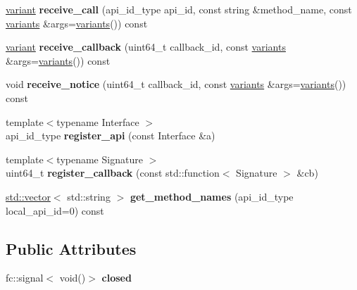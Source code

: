 \begin{DoxyCompactItemize}
\mbox{\hyperlink{classfc_1_1variant}{variant}} {\bfseries receive\+\_\+call} (api\+\_\+id\+\_\+type api\+\_\+id, const string \&method\+\_\+name, const \mbox{\hyperlink{classstd_1_1vector}{variants}} \&args=\mbox{\hyperlink{classstd_1_1vector}{variants}}()) const
\item 
\mbox{\label{classfc_1_1api__connection_a16bc734461e2954bf42d2f97be137eb8}} 
\mbox{\hyperlink{classfc_1_1variant}{variant}} {\bfseries receive\+\_\+callback} (uint64\+\_\+t callback\+\_\+id, const \mbox{\hyperlink{classstd_1_1vector}{variants}} \&args=\mbox{\hyperlink{classstd_1_1vector}{variants}}()) const
\item 
\mbox{\label{classfc_1_1api__connection_ad5bd634f7e967ca90ccc8fd4c3e9fac8}} 
void {\bfseries receive\+\_\+notice} (uint64\+\_\+t callback\+\_\+id, const \mbox{\hyperlink{classstd_1_1vector}{variants}} \&args=\mbox{\hyperlink{classstd_1_1vector}{variants}}()) const
\item 
\mbox{\label{classfc_1_1api__connection_aede0d0e920a2018f3f74841a3c98a270}} 
{\footnotesize template$<$typename Interface $>$ }\\api\+\_\+id\+\_\+type {\bfseries register\+\_\+api} (const Interface \&a)
\item 
\mbox{\label{classfc_1_1api__connection_a9c8aa3ef4091a3b634cb8413ac6979c7}} 
{\footnotesize template$<$typename Signature $>$ }\\uint64\+\_\+t {\bfseries register\+\_\+callback} (const std\+::function$<$ Signature $>$ \&cb)
\item 
\mbox{\label{classfc_1_1api__connection_a60236d3c608b33431e0016a23c51b62a}} 
\mbox{\hyperlink{classstd_1_1vector}{std\+::vector}}$<$ std\+::string $>$ {\bfseries get\+\_\+method\+\_\+names} (api\+\_\+id\+\_\+type local\+\_\+api\+\_\+id=0) const
\end{DoxyCompactItemize}
\subsection*{Public Attributes}
\begin{DoxyCompactItemize}
\item 
\mbox{\label{classfc_1_1api__connection_a7213e0fce1d2cf67df39ade2d9e06bd7}} 
fc\+::signal$<$ void()$>$ {\bfseries closed}
\end{DoxyCompactItemize}


